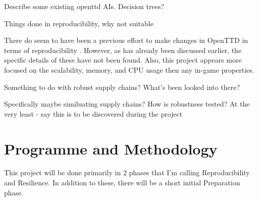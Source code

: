 \documentclass[a4paper,11pt]{article}
\begin{document}
Describe some existing openttd AIs. Decision trees?

Things done in reproducibility, why not suitable

There do seem to have been a previous effort to make changes in OpenTTD in terms of reproducibility \cite{shen_rtsenv_2011}. However, as has already been discussed earlier, the specific details of these have not been found. Also, this project appears more focused on the scalability, memory, and CPU usage then any in-game properties.

Something to do with robust supply chains? What's been looked into there?

Specifically maybe similuating supply chains? How is robustness tested? At the very least - say this is to be discovered during the project

\section{Programme and Methodology}

This project will be done primarily in 2 phases that I'm calling Reproducibility and Resilience. In addition to these, there will be a short initial Preparation phase.
\end{document}
